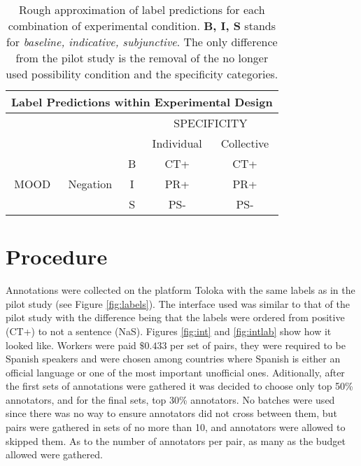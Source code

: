 \begin{table}
\centering
\begin{tabular}{|c|c|c|c|c|}
\hline
\multicolumn{5}{|c|}{Label Predictions within Experimental Design}\\\hline
                      & & &\multicolumn{2}{c|}{SPECIFICITY} \\\hline
                      & & & Individual & Collective\\\cline{4-5} 
\multirow{3}{*}{MOOD} & \multirow{3}{*}{Negation} & B & CT+ & CT+ \\\cline{3-5}
                      &                           & I & PR+& PR+ \\\cline{3-5}
                      &                           & S & PS- & PS-\\\hline                                                                           
\end{tabular}
\caption[Label predictions.]{Rough approximation of label predictions for each combination of experimental condition. \textbf{B, I, S} stands for \textit{baseline, indicative, subjunctive}. The only difference from the pilot study is the removal of the no longer used possibility condition and the specificity categories.}
\label{tab:predict}
\end{table}

\section{Procedure}\label{sect:proc}
Annotations were collected on the platform Toloka \citep{Pavlichenko2021crowdspeech} with the same labels as in the pilot study (see Figure \ref{fig:labels}). The interface used was similar to that of the pilot study with the difference being that the labels were ordered from positive (CT+) to not a sentence (NaS). Figures \ref{fig:int} and \ref{fig:intlab} show how it looked like. Workers were paid $\$0.433$ per set of pairs, they were required to be Spanish speakers and were chosen among countries where Spanish is either an official language or one of the most important unofficial ones. Aditionally, after the first sets of annotations were gathered it was decided to choose only top 50\% annotators, and for the final sets, top 30\% annotators. No batches were used since there was no way to ensure annotators did not cross between them, but pairs were gathered in sets of no more than 10, and annotators were allowed to skipped them. As to the number of annotators per pair, as many as the budget allowed were gathered.\\

